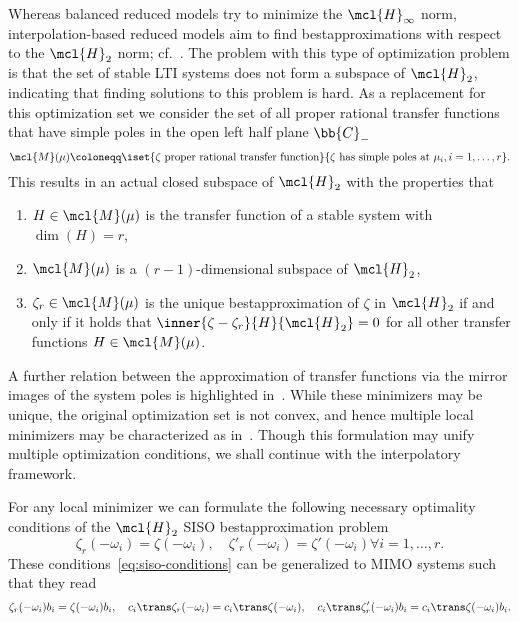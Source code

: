 Whereas balanced reduced models try to minimize the $\mcl{H}_\infty$ norm, interpolation-based reduced models aim to find bestapproximations with respect to the $\mcl{H}_2$ norm; cf.~\cite[Section~3]{Gugercin2008}.
The problem with this type of optimization problem is that the set of stable LTI systems does not form a subspace of $\mcl{H}_2$, indicating that finding solutions to this problem is hard.
As a replacement for this optimization set we consider the set of all proper rational transfer functions that have simple poles in the open left half plane $\bb{C}_{-}$
\begin{equation*}
    \mcl{M}(\mu) \coloneqq \iset{\zeta \text{ proper rational transfer function}}{\zeta \text{ has simple poles at } \mu_i, i = 1, \dots, r}.
\end{equation*}
This results in an actual closed subspace of $\mcl{H}_2$ with the properties that
\begin{enumerate}
    \item $H \in \mcl{M}(\mu)$ is the transfer function of a stable system with $\dim{(H)} = r$,
    \item $\mcl{M}(\mu)$ is a $(r - 1)$-dimensional subspace of $\mcl{H}_2$,
    \item $\zeta_r \in \mcl{M}(\mu)$ is the unique bestapproximation of $\zeta$ in $\mcl{H}_2$ if and only if it holds that $\inner{\zeta - \zeta_r}{H}{\mcl{H}_2} = 0$ for all other transfer functions $H \in \mcl{M}(\mu)$.
\end{enumerate}
A further relation between the approximation of transfer functions via the mirror images of the system poles is highlighted in~\cite[Section~3.1]{Gugercin2008}.
While these minimizers may be unique, the original optimization set is not convex, and hence multiple local minimizers may be characterized as in~\cite[Theorem~3.2]{Gugercin2008}.
Though this formulation may unify multiple optimization conditions, we shall continue with the interpolatory framework.



For any local minimizer we can formulate the following necessary optimality conditions of the $\mcl{H}_2$ SISO bestapproximation problem
\begin{equation}\label{eq:siso-conditions}
    \zeta_r(- \omega_i) = \zeta(- \omega_i),\quad \zeta'_r(- \omega_i) = \zeta'(- \omega_i) \forall i = 1, \dots, r.
\end{equation}
These conditions~\eqref{eq:siso-conditions} can be generalized to MIMO systems such that they read
\begin{equation}\label{eq:mimo-conditions}
    \zeta_r(- \omega_i) b_i = \zeta(- \omega_i) b_i,\quad c_i\trans \zeta_r(- \omega_i) = c_i\trans \zeta(- \omega_i),\quad c_i\trans \zeta'_r(- \omega_i) b_i = c_i\trans \zeta(- \omega_i) b_i.
\end{equation}

